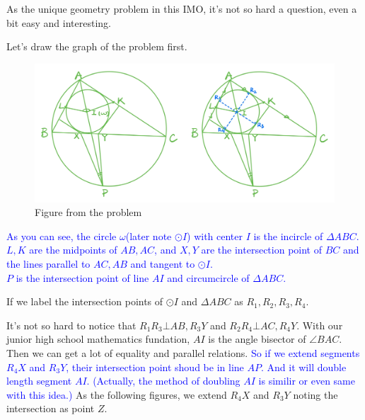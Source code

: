 \documentclass{Math_Note}
\begin{document}
\begin{sol}
As the unique geometry problem in this IMO, it's not so hard a question, even a bit easy and interesting. 

Let's draw the graph of the problem first. 

\begin{figure}[H]
    \centering
    \includegraphics[scale=0.22]{"./Figures/Q4F1.png"}
    \caption{Figure from the problem}
\end{figure}
\marginpar{\textcolor{green}{review}}
\textcolor{blue}{
As you can see, the circle $\omega$(later note $\odot I$) with center $I$ is the incircle of $\Delta ABC$. \\
$L, K$ are the midpoints of $AB, AC$, and $X, Y$ are the intersection point of $BC$ and the lines parallel to $AC, AB$ and tangent to $\odot I$. \\
$P$ is the intersection point of line $AI$ and circumcircle of $\Delta ABC$. }

If we label the intersection points of $\odot I$ and $\Delta ABC$ as $R_{1}, R_{2}, R_{3}, R_{4}$. 

It's not so hard to notice that $R_{1}R_{3} \bot AB, R_{3}Y$ and $R_{2}R_{4} \bot AC, R_{4}Y$. With our junior high school mathematics fundation, $AI$ is the angle bisector of $\angle BAC$. 
Then we can get a lot of equality and parallel relations. 
\newline\newline
\marginpar{\textcolor{green}{point}}
\textcolor{blue}{
So if we extend segments $R_{4}X$ and $R_{3}Y$, their intersection point shoud be in line $AP$. And it will double length segment $AI$. (Actually, the method of doubling $AI$ is similir or 
even same with this idea.)}
\newline\newline
\marginpar{\textcolor{green}{solution}}
As the following figures, we extend $R_{4}X$ and $R_{3}Y$ noting the intersection as point $Z$. 


\end{sol}
\end{document}
